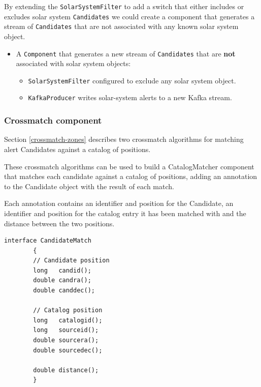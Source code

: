 \documentclass{article}
\newcommand{\kafka} {Kafka\xspace}
\newcommand{\crossmatch} {crossmatch\xspace}
\newcommand{\javaname}[1] {{\ttfamily\color{codeblue} #1}}
\begin{document}
By extending the \texttt{SolarSystemFilter} to add a switch that either includes or excludes solar system \texttt{Candidates} we could create a component that generates a stream of \texttt{Candidates} that are not associated with any known solar system object.

\begin{itemize}
    \item A \texttt{Component} that generates a new stream of \texttt{Candidates} that are \textbf{not} associated with solar system objects:
    \begin{itemize}
        \item \texttt{SolarSystemFilter} configured to exclude any solar system object.
    \end{itemize}
    \begin{itemize}
        \item \texttt{KafkaProducer} writes solar-system alerts to a new \kafka stream.
    \end{itemize}
\end{itemize}

\subsubsection{Crossmatch component}
\label{workflow.cross-match}

Section \ref{crossmatch-zones} describes two \crossmatch algorithms for matching alert Candidates against a catalog of positions.

These \crossmatch algorithms can be used to build a \javaname{CatalogMatcher} component that matches each candidate against a catalog of positions, adding an annotation to the \javaname{Candidate} object with the result of each match.

Each annotation contains an identifier and position for the \javaname{Candidate}, an identifier and position for the catalog entry it has been matched with and the distance between the two positions.

\begin{lstlisting}[style=Java]
    interface CandidateMatch
        {
        // Candidate position
        long   candid();
        double candra();
        double canddec();

        // Catalog position
        long   catalogid();
        long   sourceid();
        double sourcera();
        double sourcedec();

        double distance();
        }
\end{lstlisting}
\end{document}
